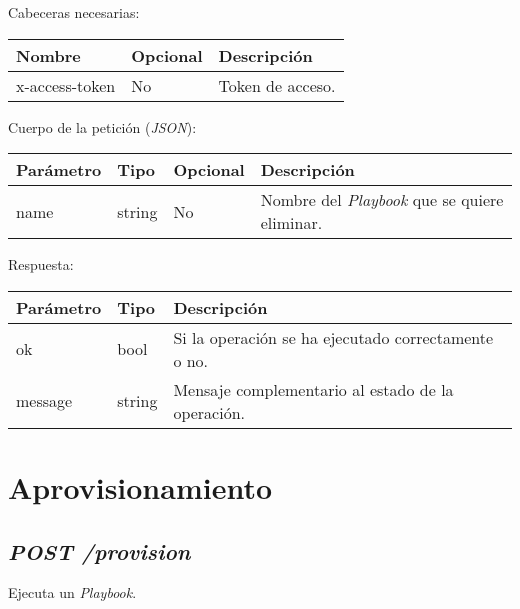 		Cabeceras necesarias:
		\begin{table}[h!]
			\centering
	\begin{adjustbox}{max width=\textwidth}
			\begin{tabular}{|l|l|l|}
				\hline
				Nombre & Opcional & Descripción \\ \hline
				x-access-token & No & Token de acceso. \\ \hline
			\end{tabular}
\end{adjustbox}
		\end{table}
		
		\pagebreak
		Cuerpo de la petición (\textit{JSON}):
		\begin{table}[h!]
			\centering
	\begin{adjustbox}{max width=\textwidth}
			\begin{tabular}{|l|l|l|l|}
				\hline
				Parámetro & Tipo & Opcional & Descripción \\ \hline
				name & string & No & Nombre del \textit{Playbook} que se quiere eliminar. \\ \hline
			\end{tabular}
\end{adjustbox}
		\end{table}
		
		Respuesta:
		\begin{table}[h!]
			\centering
	\begin{adjustbox}{max width=\textwidth}
			\begin{tabular}{|l|l|l|}
				\hline
				Parámetro & Tipo & Descripción \\ \hline
				ok & bool & Si la operación se ha ejecutado correctamente o no. \\ \hline
				message & string & Mensaje complementario al estado de la operación. \\ \hline
			\end{tabular}
\end{adjustbox}
		\end{table}











\section{Aprovisionamiento}


	\subsection{\textit{POST /provision}}
		Ejecuta un \textit{Playbook}.
	
